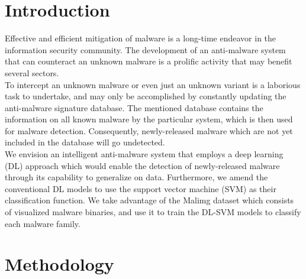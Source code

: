 \documentclass[sigconf]{acmart}
\begin{document}




\maketitle

\section{Introduction}
Effective and efficient mitigation of malware is a long-time endeavor in the information security community. The development of an anti-malware system that can counteract an unknown malware is a prolific activity that may benefit several sectors.\\
\indent	To intercept an unknown malware or even just an unknown variant is a laborious task to undertake, and may only be accomplished by constantly updating the anti-malware signature database. The mentioned database contains the information on all known malware by the particular system\cite{shelly2011discovering}, which is then used for malware detection. Consequently, newly-released malware which are not yet included in the database will go undetected.\\
\indent	We envision an intelligent anti-malware system that employs a deep learning (DL) approach which would enable the detection of newly-released malware through its capability to generalize on data. Furthermore, we amend the conventional DL models to use the support vector machine (SVM) as their classification function.
\indent	We take advantage of the Malimg dataset\cite{nataraj2011malware} which consists of visualized malware binaries, and use it to train the DL-SVM models to classify each malware family.

\section{Methodology}
\end{document}
